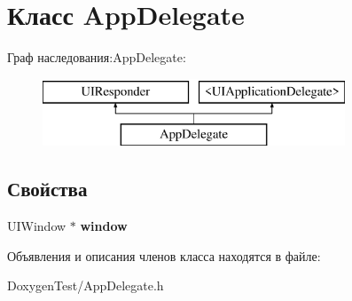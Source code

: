 \section{Класс App\+Delegate}
\label{interface_app_delegate}
Граф наследования\+:App\+Delegate\+:\begin{figure}[H]
\begin{center}
\leavevmode
\includegraphics[height=2.000000cm]{interface_app_delegate}
\end{center}
\end{figure}
\subsection*{Свойства}
\begin{DoxyCompactItemize}
\item 
U\+I\+Window $\ast$ {\bfseries window}\label{interface_app_delegate_acf48ac24125e688cac1a85445cd7fac2}

\end{DoxyCompactItemize}


Объявления и описания членов класса находятся в файле\+:\begin{DoxyCompactItemize}
\item 
Doxygen\+Test/App\+Delegate.\+h\end{DoxyCompactItemize}
